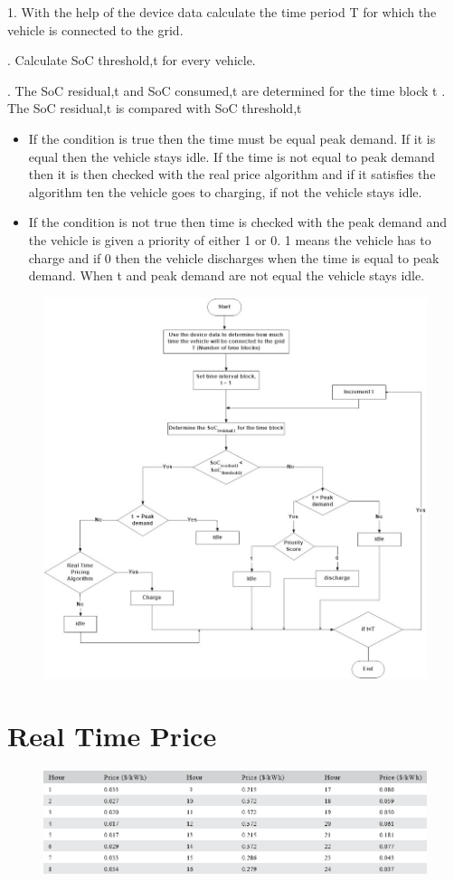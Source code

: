	1. With the help of the device data calculate the time period T for which the vehicle is
	connected to the grid.
	
	. Calculate SoC threshold,t for every vehicle.
	
	. The SoC residual,t and SoC consumed,t are determined for the time block t
	. The SoC residual,t is compared with SoC threshold,t
	\begin{itemize}


	 \item If the condition is true then the time must be equal peak demand. If it is equal then
	the vehicle stays idle. If the time is not equal to peak demand then it is then
	checked with the real price algorithm and if it satisfies the algorithm ten the
	vehicle goes to charging, if not the vehicle stays idle.
	
	\item If the condition is not true then time is checked with the peak demand and the
	vehicle is given a priority of either 1 or 0. 1 means the vehicle has to charge and if
	0 then the vehicle discharges when the time is equal to peak demand. When t and
	peak demand are not equal the vehicle stays idle.
	
		\end{itemize}
	
	\begin{figure}
		\centering
		\includegraphics[width=0.9\linewidth]{Figures/Ev_flowchart}
		\caption{}
		\label{fig:evflowchart}
	\end{figure}


	\section{Real Time Price}
	
		\begin{figure}[!h]
			\centering
			\includegraphics[width=0.7\linewidth]{Figures/rtp}
			\caption{}
			\label{fig:rtp}
		\end{figure}
	
	
